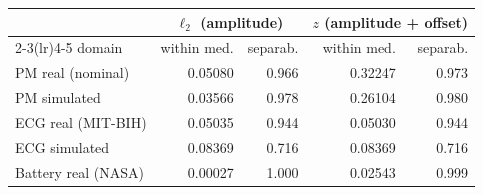 \begin{tabular}{lrrrr}
\toprule
& \multicolumn{2}{c}{$\ell_2$ (amplitude)} & \multicolumn{2}{c}{$z$ (amplitude + offset)} \\
\cmidrule(lr){2-3}\cmidrule(lr){4-5}
domain & within med. & separab. & within med. & separab. \\
\midrule
PM real (nominal) & 0.05080 & 0.966 & 0.32247 & 0.973 \\
PM simulated & 0.03566 & 0.978 & 0.26104 & 0.980 \\
ECG real (MIT-BIH) & 0.05035 & 0.944 & 0.05030 & 0.944 \\
ECG simulated & 0.08369 & 0.716 & 0.08369 & 0.716 \\
Battery real (NASA) & 0.00027 & 1.000 & 0.02543 & 0.999 \\
\bottomrule
\end{tabular}
